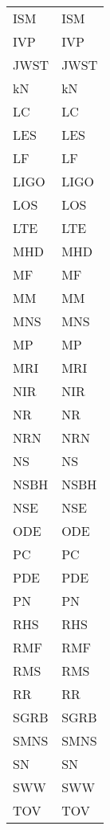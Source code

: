 {\begin{longtable}{ p{}  p{} }
    \acs{ISM} & \acl{ISM}  \\
    \acs{IVP} & \acl{IVP}  \\
    \acs{JWST} & \acl{JWST}  \\
    \acs{kN} & \acl{kN}  \\
    \acs{LC} & \acl{LC}  \\
    \acs{LES} & \acl{LES}  \\
    \acs{LF} & \acl{LF}  \\
    \acs{LIGO} & \acl{LIGO}  \\
    \acs{LOS} & \acl{LOS}  \\
    \acs{LTE} & \acl{LTE}  \\
    \acs{MHD} & \acl{MHD}  \\
    \acs{MF} & \acl{MF}  \\
    \acs{MM} & \acl{MM}  \\
    \acs{MNS} & \acl{MNS}  \\
    \acs{MP} & \acl{MP}  \\
    \acs{MRI} & \acl{MRI}  \\
    \acs{NIR} & \acl{NIR}  \\
    \acs{NR} & \acl{NR}  \\
    \acs{NRN} & \acl{NRN}  \\
    \acs{NS} & \acl{NS}  \\
    \acs{NSBH} & \acl{NSBH}  \\
    \acs{NSE} & \acl{NSE}  \\
    \acs{ODE} & \acl{ODE}  \\
    \acs{PC} & \acl{PC}  \\
    \acs{PDE} & \acl{PDE}  \\
    \acs{PN} & \acl{PN}  \\
    \acs{RHS} & \acl{RHS}  \\
    \acs{RMF} & \acl{RMF}  \\
    \acs{RMS} & \acl{RMS}  \\
    \acs{RR} & \acl{RR}  \\
    \acs{SGRB} & \acl{SGRB}  \\
    \acs{SMNS} & \acl{SMNS}  \\
    \acs{SN} & \acl{SN}  \\
    \acs{SWW} & \acl{SWW}  \\
    \acs{TOV} & \acl{TOV}  \\
\end{longtable}
} 

